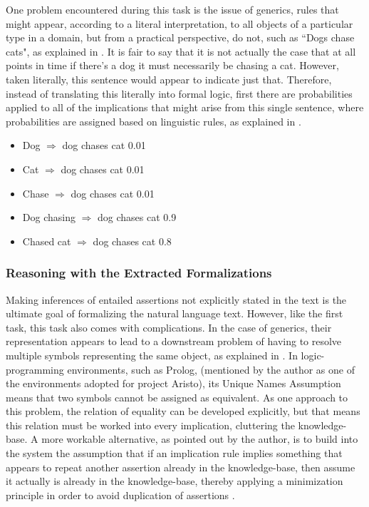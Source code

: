 One problem encountered during this task is the issue of generics, rules that might appear, according to a literal interpretation, to all objects of a particular type in a domain, but from a practical perspective, do not, such as ``Dogs chase cats", as explained in \cite{clark2014interpreting}.  It is fair to say that it is not actually the case that at all points in time if there's a dog it must necessarily be chasing a cat.  However, taken literally, this sentence would appear to indicate just that.  Therefore, instead of translating this literally into formal logic, first there are probabilities applied to all of the implications that might arise from this single sentence, where probabilities are assigned based on linguistic rules, as explained in \cite{clark2014interpreting}.

\begin{itemize}
\item Dog $\Rightarrow$ dog chases cat 0.01
\item Cat $\Rightarrow$ dog chases cat 0.01
\item Chase $\Rightarrow$ dog chases cat 0.01
\item Dog chasing $\Rightarrow$ dog chases cat 0.9
\item Chased cat $\Rightarrow$ dog chases cat 0.8 \cite{clark2015elementary}
\end{itemize}

\subsubsection{Reasoning with the Extracted Formalizations}

Making inferences of entailed assertions not explicitly stated in the text is the ultimate goal of formalizing the natural language text.  However, like the first task, this task also comes with complications.  In the case of generics, their representation appears to lead to a downstream problem of having to resolve multiple symbols representing the same object, as explained in \cite{clark2014interpreting}.  In logic-programming environments, such as Prolog, \cite{blackburn_2006_prolog_ch1,blackburn_2006_prolog_ch2,blackburn_2006_prolog_ch3,blackburn_2006_prolog_ch4,blackburn_2006_prolog_ch5,blackburn_2006_prolog_ch6} (mentioned by the author as one of the environments adopted for project Aristo), its Unique Names Assumption means that two symbols cannot be assigned as equivalent.  As one approach to this problem, the relation of equality can be developed explicitly, but that means this relation must be worked into every implication, cluttering the knowledge-base.  A more workable alternative, as pointed out by the author, is to build into the system the assumption that if an implication rule implies something that appears to repeat another assertion already in the knowledge-base, then assume it actually is already in the knowledge-base, thereby applying a minimization principle in order to avoid duplication of assertions \cite{clark2014interpreting}.

